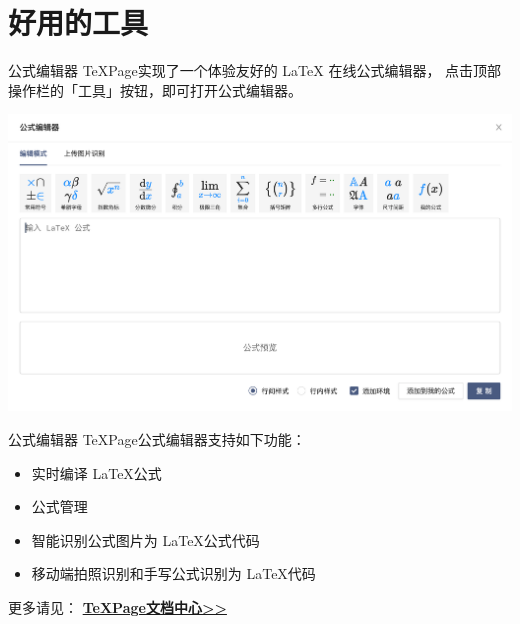 \documentclass{beamer}
\DeclareRobustCommand\texpage{\TeX Page}
\begin{document}
\section{好用的工具}

\begin{frame}{公式编辑器}
\texpage 实现了一个体验友好的 LaTeX 在线公式编辑器，
点击顶部操作栏的「工具」按钮，即可打开公式编辑器。

\begin{center}
\includegraphics[width=.8\textwidth]{imgs/math.png}
\end{center}

\end{frame}



\begin{frame}{公式编辑器}
\texpage 公式编辑器支持如下功能：
\begin{itemize}
\item 实时编译 \LaTeX 公式
\item 公式管理
\item 智能识别公式图片为 \LaTeX 公式代码
\item 移动端拍照识别和手写公式识别为 \LaTeX 代码
\end{itemize}
\end{frame}



\begin{frame}[standout]
\begin{center}
\Large 更多请见：
\href{https://www.texpage.com/docs/}{\textbf{\texpage 文档中心{}>>}}
\end{center}
\end{frame}
\end{document}
